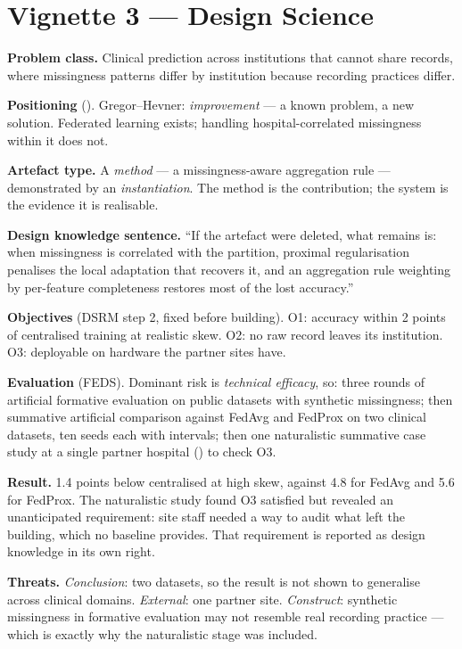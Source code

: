 \section{Vignette 3 --- Design Science}

\begin{vignette}
\textbf{Problem class.} Clinical prediction across institutions that cannot
share records, where missingness patterns differ by institution because
recording practices differ.

\medskip
\textbf{Positioning} (). Gregor--Hevner:
\emph{improvement} --- a known problem, a new solution. Federated learning
exists; handling hospital-correlated missingness within it does not.

\medskip
\textbf{Artefact type.} A \emph{method} --- a missingness-aware aggregation
rule --- demonstrated by an \emph{instantiation}. The method is the
contribution; the system is the evidence it is realisable.

\medskip
\textbf{Design knowledge sentence.} ``If the artefact were deleted, what
remains is: when missingness is correlated with the partition, proximal
regularisation penalises the local adaptation that recovers it, and an
aggregation rule weighting by per-feature completeness restores most of the
lost accuracy.''

\medskip
\textbf{Objectives} (DSRM step 2, fixed before building). O1: accuracy within
2 points of centralised training at realistic skew. O2: no raw record leaves
its institution. O3: deployable on hardware the partner sites have.

\medskip
\textbf{Evaluation} (FEDS). Dominant risk is \emph{technical efficacy}, so:
three rounds of artificial formative evaluation on public datasets with
synthetic missingness; then summative artificial comparison against FedAvg and
FedProx on two clinical datasets, ten seeds each with intervals; then one
naturalistic summative case study at a single partner hospital
() to check O3.

\medskip
\textbf{Result.} 1.4 points below centralised at high skew, against 4.8 for
FedAvg and 5.6 for FedProx. The naturalistic study found O3 satisfied but
revealed an unanticipated requirement: site staff needed a way to audit what
left the building, which no baseline provides. That requirement is reported as
design knowledge in its own right.

\medskip
\textbf{Threats.} \emph{Conclusion}: two datasets, so the result is not shown to
generalise across clinical domains. \emph{External}: one partner site.
\emph{Construct}: synthetic missingness in formative evaluation may not
resemble real recording practice --- which is exactly why the naturalistic
stage was included.
\end{vignette}


